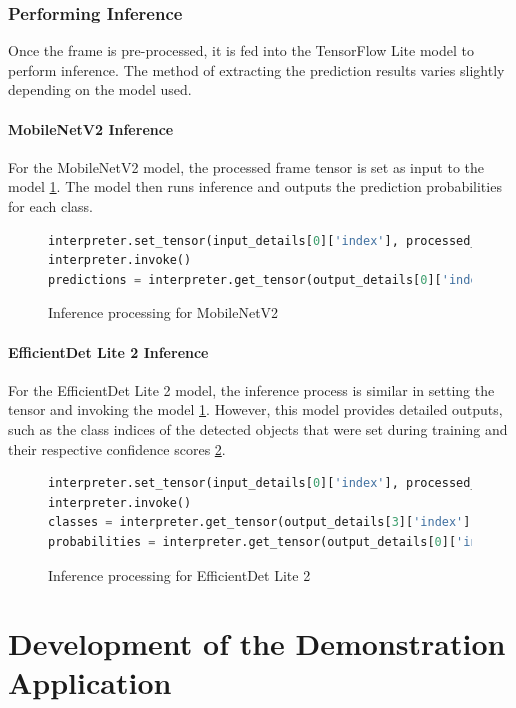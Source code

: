 \subsection{Performing Inference}
Once the frame is pre-processed, it is fed into the TensorFlow Lite model to perform inference. The method of extracting the prediction results varies slightly depending on the model used.

\subsubsection{MobileNetV2 Inference}
For the MobileNetV2 model, the processed frame tensor is set as input to the model \ref{code:mobilenetv2_inference}. The model then runs inference and outputs the prediction probabilities for each class.

\begin{figure}[H]
\begin{lstlisting}[language=Python]
interpreter.set_tensor(input_details[0]['index'], processed_frame)
interpreter.invoke()
predictions = interpreter.get_tensor(output_details[0]['index'])
\end{lstlisting}
\caption{Inference processing for MobileNetV2}
\label{code:mobilenetv2_inference}
\end{figure}

\subsubsection{EfficientDet Lite 2 Inference}
For the EfficientDet Lite 2 model, the inference process is similar in setting the tensor and invoking the model \ref{code:mobilenetv2_inference}. However, this model provides detailed outputs, such as the class indices of the detected objects that were set during training and their respective confidence scores \ref{code:edl2_inference}.

\begin{figure}[H]
\begin{lstlisting}[language=Python]
interpreter.set_tensor(input_details[0]['index'], processed_frame)
interpreter.invoke()
classes = interpreter.get_tensor(output_details[3]['index'])[0]  % Class index
probabilities = interpreter.get_tensor(output_details[0]['index'])[0]  % Confidence
\end{lstlisting}
\caption{Inference processing for EfficientDet Lite 2}
\label{code:edl2_inference}
\end{figure}

\chapter{Development of the Demonstration Application}

